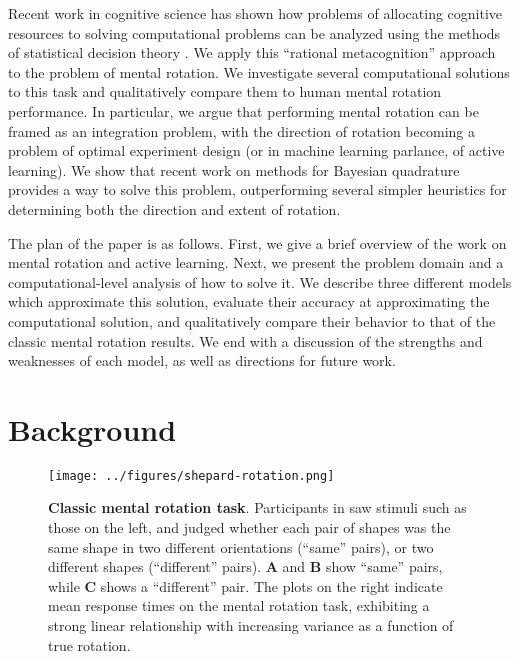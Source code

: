 \documentclass{article} %
\begin{document}
Recent work in cognitive science has shown how problems of allocating
cognitive resources to solving computational problems can be analyzed
using the methods of statistical decision theory
\cite{Lieder:2012wg,Vul:2009wy}. We apply this ``rational
metacognition'' approach to the problem of mental rotation. We
investigate several computational solutions to this task and
qualitatively compare them to human mental rotation performance. In
particular, we argue that performing mental rotation can be framed as
an integration problem, with the direction of rotation becoming a
problem of optimal experiment design (or in machine learning parlance,
of active learning). We show that recent work on methods for Bayesian
quadrature \cite{Diaconis:1988uo,OHagan:1991tx,Osborne:2012tm}
provides a way to solve this problem, outperforming several simpler
heuristics for determining both the direction and extent of rotation.

The plan of the paper is as follows. First, we give a brief overview
of the work on mental rotation and active learning. Next, we present
the problem domain and a computational-level analysis of how to solve
it. We describe three different models which approximate this
solution, evaluate their accuracy at approximating the computational
solution, and qualitatively compare their behavior to that of the
classic mental rotation results. We end with a discussion of the
strengths and weaknesses of each model, as well as directions for
future work.


\section{Background}

\begin{figure}[t]
  \centering
  \texttt{[image: ../figures/shepard-rotation.png]}
  \caption{\textbf{Classic mental rotation task}. Participants in
    \cite{Shepard1971} saw stimuli such as those on the left, and
    judged whether each pair of shapes was the same shape in two
    different orientations (``same'' pairs), or two different shapes
    (``different'' pairs). \textbf{A} and \textbf{B} show ``same''
    pairs, while \textbf{C} shows a ``different'' pair. The plots on
    the right indicate mean response times on the mental rotation
    task, exhibiting a strong linear relationship with increasing
    variance as a function of true rotation.}
  \label{fig:mental-rotation}
\end{figure}
\end{document}
